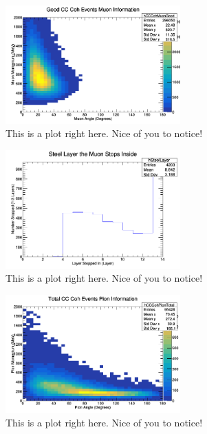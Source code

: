\documentclass[11pt]{article}
\begin{document}
\begin{figure}[H]
\centering
\includegraphics[width=0.6\textwidth]{NewANMBergerSehgalImages/6-GoodCCCohMuonInfoANMBS.png}
\caption{This is a plot right here. Nice of you to notice!}
\end{figure}

\begin{figure}[H]
\centering
\includegraphics[width=0.6\textwidth]{NewANMBergerSehgalImages/7-LayerPenetrationANMBS.png}
\caption{This is a plot right here. Nice of you to notice!}
\end{figure}

\begin{figure}[H]
\centering
\includegraphics[width=0.6\textwidth]{NewANMBergerSehgalImages/8-TotalCCCohPionInfoANMBS.png}
\caption{This is a plot right here. Nice of you to notice!}
\end{figure}
\end{document}

